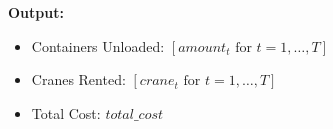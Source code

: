 \documentclass{article}
\begin{document}
\textbf{Output:}
\begin{itemize}
    \item Containers Unloaded: \( [amount_t \text{ for } t = 1, \ldots, T] \)
    \item Cranes Rented: \( [crane_t \text{ for } t = 1, \ldots, T] \)
    \item Total Cost: \( total\_cost \)
\end{itemize}
\end{document}
